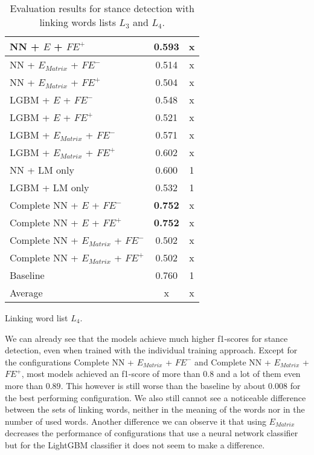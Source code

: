 \begin{table}[h]
\begin{subtable}{.5\textwidth}
\begin{tabular}{|| l || c | c ||}
 			\hline
 			NN + $E$ + $\textit{FE}^+$ & 0.593 & x \\
 			\hline
 			NN + $E_{Matrix}$ + $\textit{FE}^-$ & 0.514 & x \\
 			\hline
 			NN + $E_{Matrix}$ + $\textit{FE}^+$ & 0.504 & x \\
 			\hline
 			LGBM + $E$ + $\textit{FE}^-$ & 0.548 & x \\
 			\hline
 			LGBM + $E$ + $\textit{FE}^+$ & 0.521 & x \\
 			\hline
 			LGBM + $E_{Matrix}$ + $\textit{FE}^-$ & 0.571 & x \\
 			\hline
 			LGBM + $E_{Matrix}$ + $\textit{FE}^+$ & 0.602 & x \\
 			\hline
 			NN + LM only & 0.600 & 1 \\
 			\hline
 			LGBM + LM only & 0.532 & 1 \\
 			\hline
 			Complete NN + $E$ + $\textit{FE}^-$ & \textbf{0.752} & x \\
 			\hline
 			Complete NN + $E$ + $\textit{FE}^+$ & \textbf{0.752} & x \\
 			\hline
 			Complete NN + $E_{Matrix}$ + $\textit{FE}^-$ & 0.502 & x \\
 			\hline
 			Complete NN + $E_{Matrix}$ + $\textit{FE}^+$ & 0.502 & x \\
 			\hline
 			Baseline & 0.760 & 1\\
 			\hline
 			\hline
 			Average & x & x \\
 			\hline
		\end{tabular}
		\renewcommand{\arraystretch}{1}
  		\caption{Linking word list $L_4$.}%
  	\end{subtable}
  	\caption{Evaluation results for stance detection with linking words lists $L_3$ and $L_4$.}%
  	\label{fig:stanceresults2}
\end{table}

We can already see that the models achieve much higher f1-scores for stance detection, even when trained with the individual training approach. Except for the configurations Complete NN + $E_{Matrix}$ + $\textit{FE}^-$ and Complete NN + $E_{Matrix}$ + $\textit{FE}^+$, most models achieved an f1-score of more than $0.8$ and a lot of them even more than $0.89$. This however is still worse than the baseline by about $0.008$ for the best performing configuration. We also still cannot see a noticeable difference between the sets of linking words, neither in the meaning of the words nor in the number of used words. Another difference we can observe it that using $E_{Matrix}$ decreases the performance of configurations that use a neural network classifier but for the LightGBM classifier it does not seem to make a difference.

